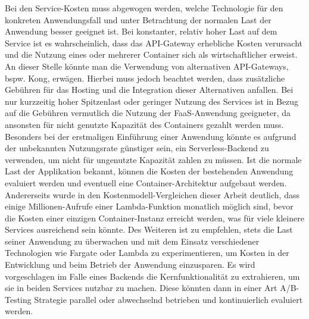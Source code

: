 Bei den Service-Kosten muss abgewogen werden, welche Technologie für den konkreten Anwendungsfall und unter Betrachtung der normalen Last der Anwendung besser geeignet ist. Bei konstanter, relativ hoher Last auf dem Service ist es wahrscheinlich, dass das API-Gateway erhebliche Kosten verursacht und die Nutzung eines oder mehrerer Container sich als wirtschaftlicher erweist. An dieser Stelle könnte man die Verwendung von alternativen API-Gateways, bspw. Kong\cite{noauthor_kongkong_2021}, erwägen. Hierbei muss jedoch beachtet werden, dass zusätzliche Gebühren für das Hosting und die Integration dieser Alternativen anfallen. Bei nur kurzzeitig hoher Spitzenlast oder geringer Nutzung des Services ist in Bezug auf die Gebühren vermutlich die Nutzung der \ac{FaaS}-Anwendung geeigneter, da ansonsten für nicht genutzte Kapazität des Containers gezahlt werden muss. 
Besonders bei der erstmaligen Einführung einer Anwendung könnte es aufgrund der unbekannten Nutzungsrate günstiger sein, ein Serverless-Backend zu verwenden, um nicht für ungenutzte Kapazität zahlen zu müssen. Ist die normale Last der Applikation bekannt, können die Kosten der bestehenden Anwendung evaluiert werden und eventuell eine Container-Architektur aufgebaut werden. Andererseits wurde in den Kostenmodell-Vergleichen dieser Arbeit deutlich, dass einige Millionen-Aufrufe einer Lambda-Funktion monatlich möglich sind, bevor die Kosten einer einzigen Container-Instanz erreicht werden, was für viele kleinere Services ausreichend sein könnte.
Des Weiteren ist zu empfehlen, stets die Last seiner Anwendung zu überwachen und mit dem Einsatz verschiedener Technologien wie Fargate oder Lambda zu experimentieren, um Kosten in der Entwicklung und beim Betrieb der Anwendung einzusparen. Es wird vorgeschlagen im Falle eines Backends die Kernfunktionalität zu extrahieren, um sie in beiden Services nutzbar zu machen. Diese könnten dann in einer Art A/B-Testing Strategie parallel oder abwechselnd betrieben und kontinuierlich evaluiert werden.